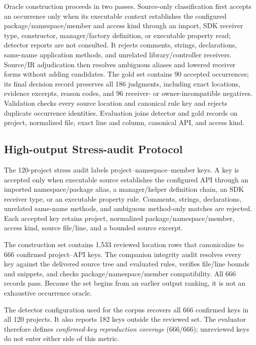 Oracle construction proceeds in two passes. Source-only classification first accepts an occurrence only when its executable context establishes the configured package/namespace/member and access kind through an import, SDK receiver type, constructor, manager/factory definition, or executable property read; detector reports are not consulted. It rejects comments, strings, declarations, same-name application methods, and unrelated library/controller receivers. Source/IR adjudication then resolves ambiguous aliases and lowered receiver forms without adding candidates. The gold set contains 90 accepted occurrences; its final decision record preserves all 186 judgments, including exact locations, evidence excerpts, reason codes, and 96 receiver- or owner-incompatible negatives. Validation checks every source location and canonical rule key and rejects duplicate occurrence identities. Evaluation joins detector and gold records on project, normalized file, exact line and column, canonical API, and access kind.

\subsection{High-output Stress-audit Protocol}

The 120-project stress audit labels project--namespace--member keys. A key is accepted only when executable source establishes the configured API through an imported namespace/package alias, a manager/helper definition chain, an SDK receiver type, or an executable property rule. Comments, strings, declarations, unrelated same-name methods, and ambiguous method-only matches are rejected. Each accepted key retains project, normalized package/namespace/member, access kind, source file/line, and a bounded source excerpt.

The construction set contains 1,533 reviewed location rows that canonicalize to 666 confirmed project--API keys. The companion integrity audit resolves every key against the delivered source tree and evaluated rules, verifies file/line bounds and snippets, and checks package/namespace/member compatibility. All 666 records pass. Because the set begins from an earlier output ranking, it is not an exhaustive occurrence oracle.

The detector configuration used for the corpus recovers all 666 confirmed keys in all 120 projects. It also reports 182 keys outside the reviewed set. The evaluator therefore defines \emph{confirmed-key reproduction coverage} (666/666); unreviewed keys do not enter either side of this metric.

